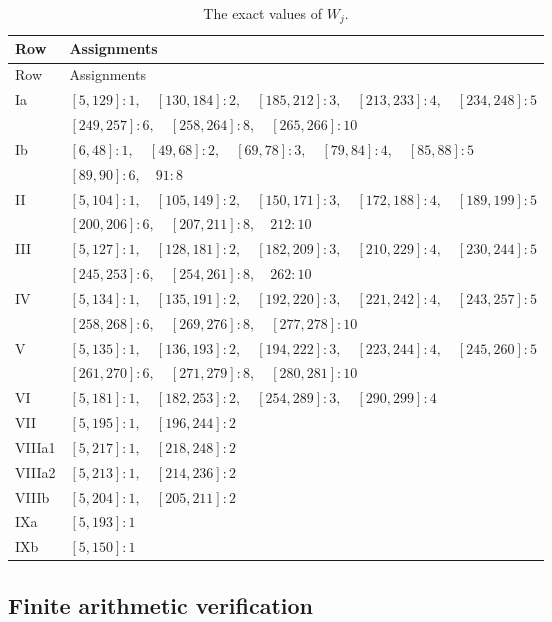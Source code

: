 \documentclass[11pt,reqno]{amsart}
\numberwithin{equation}{section}
\theoremstyle{definition}
\theoremstyle{remark}
\begin{document}
\begin{longtable}{@{}lp{}@{}}
\caption{The exact values of $W_j$.}\label{bc:W-table}\\
\toprule Row&Assignments\\\midrule\endfirsthead
\toprule Row&Assignments\\\midrule\endhead
Ia & $[5,129]:1,\quad [130,184]:2,\quad [185,212]:3,\quad [213,233]:4,\quad [234,248]:5$\\
 & $[249,257]:6,\quad [258,264]:8,\quad [265,266]:10$\\
Ib & $[6,48]:1,\quad [49,68]:2,\quad [69,78]:3,\quad [79,84]:4,\quad [85,88]:5$\\
 & $[89,90]:6,\quad 91:8$\\
II & $[5,104]:1,\quad [105,149]:2,\quad [150,171]:3,\quad [172,188]:4,\quad [189,199]:5$\\
 & $[200,206]:6,\quad [207,211]:8,\quad 212:10$\\
III & $[5,127]:1,\quad [128,181]:2,\quad [182,209]:3,\quad [210,229]:4,\quad [230,244]:5$\\
 & $[245,253]:6,\quad [254,261]:8,\quad 262:10$\\
IV & $[5,134]:1,\quad [135,191]:2,\quad [192,220]:3,\quad [221,242]:4,\quad [243,257]:5$\\
 & $[258,268]:6,\quad [269,276]:8,\quad [277,278]:10$\\
V & $[5,135]:1,\quad [136,193]:2,\quad [194,222]:3,\quad [223,244]:4,\quad [245,260]:5$\\
 & $[261,270]:6,\quad [271,279]:8,\quad [280,281]:10$\\
VI & $[5,181]:1,\quad [182,253]:2,\quad [254,289]:3,\quad [290,299]:4$\\
VII & $[5,195]:1,\quad [196,244]:2$\\
VIIIa1 & $[5,217]:1,\quad [218,248]:2$\\
VIIIa2 & $[5,213]:1,\quad [214,236]:2$\\
VIIIb & $[5,204]:1,\quad [205,211]:2$\\
IXa & $[5,193]:1$\\
IXb & $[5,150]:1$\\
\bottomrule\end{longtable}

\subsection{Finite arithmetic verification}
\label{bc:arithmetic}
\end{document}
